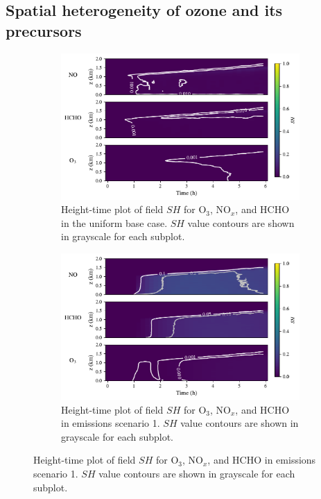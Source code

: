 \subsection{Spatial heterogeneity of ozone and its precursors}

\begin{figure}[h]
  \centering
  \begin{subfigure}
    \centering
    \includegraphics[width=.97\textwidth]{figures/chapter4/height-time-nsh-multivar-uniform-basecase.pdf}
    \caption{Height-time plot of field $SH$ for O$_3$, NO$_x$, and HCHO in the uniform base case. $SH$ value contours are shown in grayscale for each subplot.}
  \end{subfigure}
     \vspace*{2mm} 
  \begin{subfigure}
    \centering
    \includegraphics[width=.97\textwidth]{figures/chapter4/height-time-nsh-multivar-fx1fy0.pdf}
    \caption{Height-time plot of field $SH$ for O$_3$, NO$_x$, and HCHO in emissions scenario 1. $SH$ value contours are shown in grayscale for each subplot.}
  \end{subfigure}
 \end{figure}

